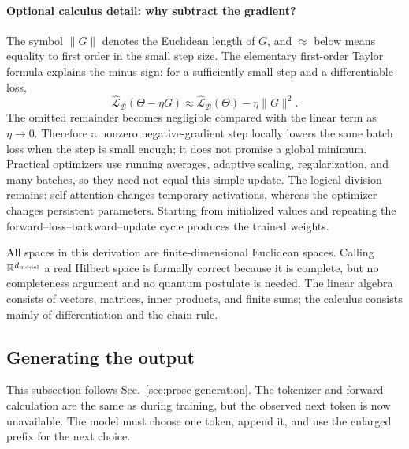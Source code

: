 \documentclass[
  aps,
  reprint,
  superscriptaddress,
  floatfix,
  nofootinbib,
  longbibliography
]{revtex4-2}
\newcommand{\R}{\mathbb{R}}
\newcommand{\norm}[1]{\lVert #1 \rVert}
\begin{document}
\paragraph{Optional calculus detail: why subtract the gradient?}
The symbol $\norm{G}$ denotes the Euclidean length of $G$, and $\approx$ below
means equality to first order in the small step size.  The elementary
first-order Taylor formula explains the minus sign: for a sufficiently small
step and a differentiable loss,
\begin{equation}
\label{eq:app-first-order-descent}
\widehat{\mathcal L}_{\mathcal B}(\Theta-\eta G)
\approx
\widehat{\mathcal L}_{\mathcal B}(\Theta)
-\eta\norm{G}^2.
\end{equation}
The omitted remainder becomes negligible compared with the linear term as
$\eta\to0$.  Therefore a nonzero negative-gradient step locally lowers the
same batch loss when the step is small enough; it does not promise a global
minimum.  Practical optimizers use running averages, adaptive scaling,
regularization, and many batches, so they need not equal this simple update.
The logical division remains: self-attention changes temporary activations,
whereas the optimizer changes persistent parameters.  Starting from initialized
values and repeating the forward--loss--backward--update cycle produces the
trained weights.

All spaces in this derivation are finite-dimensional Euclidean spaces.
Calling $\R^{d_{\rm model}}$ a real Hilbert space is formally correct because it is complete,
but no completeness argument and no quantum postulate is needed.  The linear
algebra consists of vectors, matrices, inner products, and finite sums; the
calculus consists mainly of differentiation and the chain rule.

\subsection{Generating the output}
\label{app:generation}

This subsection follows Sec.~\ref{sec:prose-generation}.  The tokenizer and
forward calculation are the same as during training, but the observed next
token is now unavailable.  The model must choose one token, append it, and use
the enlarged prefix for the next choice.
\end{document}
